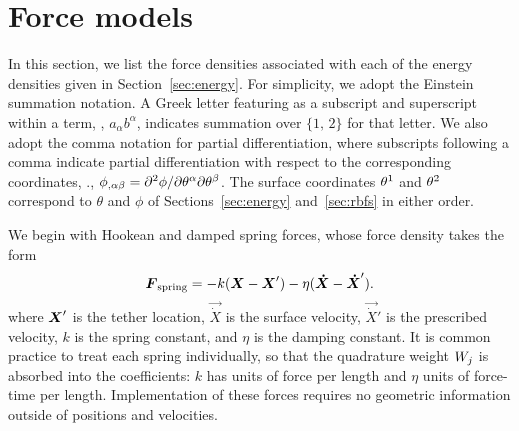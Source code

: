 \section{Force models}\label{sec:forces}
In this section, we list the force densities associated with each of the energy densities
given in Section~\ref{sec:energy}. For simplicity, we adopt the Einstein summation
notation. A Greek letter featuring as a subscript and superscript within a term,
, $a_\alpha b^\alpha$, indicates summation over $\{1,\,2\}$ for that letter.
We also adopt the comma notation for partial differentiation, where subscripts following
a comma indicate partial differentiation with respect to the corresponding coordinates,
., $\phi_{,\alpha\beta} = \partial^2\phi/\partial\q[\alpha]\partial\q[\beta]$.
The surface coordinates $\q[1]$ and $\q[2]$ correspond to $\theta$ and $\phi$ of
Sections~\ref{sec:energy} and~\ref{sec:rbfs} in either order.

We begin with Hookean and damped spring forces, whose force density takes the form
\begin{equation}
    \boldsymbol{F}_\text{spring} = -k (\boldsymbol{X} - \boldsymbol{X}') - \eta(\boldsymbol{\dot{X}}-\boldsymbol{\dot{X}}').
\end{equation}
where $\boldsymbol{X}'$ is the tether location, $\vec{\dot{X}}$ is the surface velocity,
$\vec{\dot{X}}'$ is the prescribed velocity, $k$ is the spring constant, and $\eta$ is
the damping constant. It is common practice to treat each spring individually, so that
the quadrature weight $\weight[j]$ is absorbed into the coefficients: $k$ has units of
force per length and $\eta$ units of force-time per length. Implementation of these
forces requires no geometric information outside of positions and velocities.

